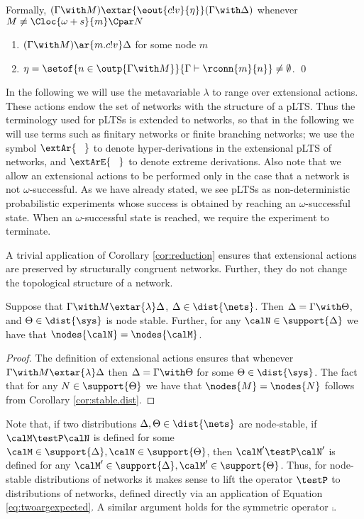 \documentclass{LMCS}
\begin{document}
\begin{defi}
\begin{enumerate}
Formally, $(\Gamma \with M) \extar{\eout{c!v}{\eta}} (\Gamma \with
    \Delta)$ whenever $M \not\equiv \Cloc{\omega + s}{m} \Cpar N$

 \begin{enumerate}[label=(\roman*)]
 \item  $(\Gamma \with M) \ar{m.c!v} \Delta $ for some node $m$
 \item  $\eta = \setof{n \in \outp{\Gamma \with M}}{\Gamma \vdash \rconn{m}{n}}  \not = \emptyset$. \qed
 \end{enumerate}
\end{enumerate}
\end{defi}

\noindent In the following we will use the metavariable $\lambda$ to range 
over extensional actions. These actions endow the set of networks with the
structure of a pLTS. Thus the terminology used for pLTSs is extended to networks, 
so that in the following we will use terms such as finitary networks or finite branching networks; 
we use the symbol $\extAr{\;\;\;}$ to denote hyper-derivations in the 
extensional pLTS of networks, and $\extArE{\;\;\;}$ to denote extreme derivations.
Also note that we allow an extensional actions to 
be performed only in the case that a network is not $\omega$-successful. 
As we have already stated, we see pLTSs as non-deterministic probabilistic experiments 
whose success is obtained by reaching an $\omega$-successful state. When an 
$\omega$-successful state is reached, we require the experiment to terminate.


A trivial application of Corollary \ref{cor:reduction} ensures that extensional actions 
are preserved by structurally congruent networks.
Further, they do not change the topological structure of a network.

\begin{prop}
\label{prop:static.topology}
Suppose that $\Gamma \with M \extar{\lambda} \Delta$, 
$\Delta \in \dist{\nets}$. 
Then $\Delta = \Gamma \with \Theta$, and $\Theta \in \dist{\sys}$ is 
node stable. Further, for any $\calN \in \support{\Delta}$ 
we have that $\nodes{\calN} = \nodes{\calM}$.
\end{prop}

\begin{proof}
The definition of extensional actions ensures that 
whenever $\Gamma \with M \extar{\lambda} \Delta$ 
then $\Delta = \Gamma \with \Theta$ for some 
$\Theta \in \dist{\sys}$. 
The fact that for any $N \in \support{\Theta}$ 
we have that $\nodes{M} = \nodes{N}$ 
follows from Corollary \ref{cor:stable.dist}.
\end{proof}
Note that, if two distributions $\Delta, \Theta \in \dist{\nets}$ 
are node-stable, if $\calM \testP \calN$ is defined for some  
$\calM \in \support{\Delta}, \calN \in \support{\Theta}$, then 
$\calM' \testP \calN'$ is defined for any $\calM' \in \support{\Delta}, 
\calM' \in \support{\Theta}$. Thus, for node-stable distributions 
of networks it makes sense to lift the operator $\testP$ 
to distributions of networks, defined directly via an application 
of Equation \ref{eq:twoargexpected}. A similar argument holds 
for the symmetric operator $\comp$.
\end{document}
